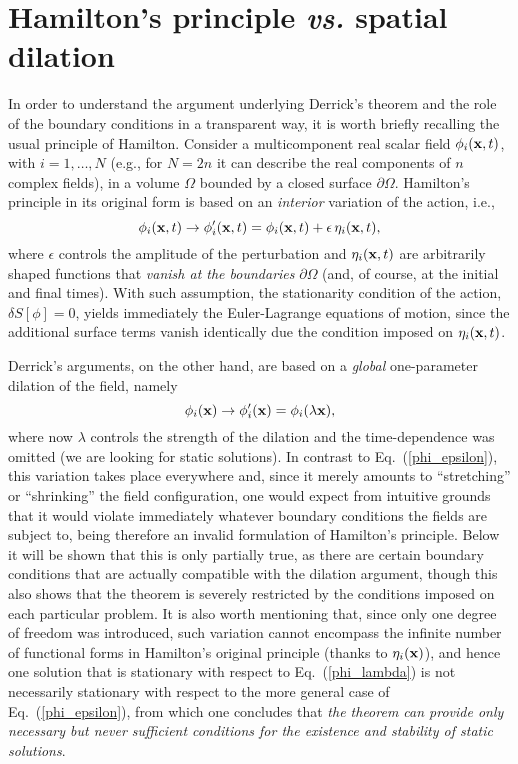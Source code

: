 \documentclass[a4paper,prd,twocolumn,showpacs,amsmath]{revtex4}
\newcommand{\vecx}{{\bf x}}
\newcommand{\domega}{\partial \Omega}
\begin{document}

\section{Hamilton's principle {\em vs.} spatial dilation} \label{hamilt}
In order to understand the argument underlying Derrick's theorem and the role of the boundary conditions
in a transparent way, it is worth briefly recalling the usual principle of Hamilton. Consider a multicomponent
real scalar field $\phi_i(\vecx,t)$, with $i=1,\ldots,N$ (e.g., for $N=2n$ it can describe the real components of
$n$ complex fields), in a volume $\Omega$ bounded by a closed surface $\domega$. Hamilton's principle
in its original form is based on an {\em interior} variation of the action, i.e.,
\begin{equation} \label{phi_epsilon}
  \phi_i(\vecx,t) \to \phi_i'(\vecx,t) = \phi_i(\vecx,t) + \epsilon \, \eta_i(\vecx,t),
\end{equation}
where $\epsilon$ controls the amplitude of the perturbation and $\eta_i(\vecx,t)$ are arbitrarily shaped
functions that {\em vanish at the boundaries} $\domega$ (and, of course, at the initial
and final times). With such assumption, the stationarity condition of the action, $\delta S[\phi]=0$, yields
immediately the Euler-Lagrange equations of motion, since the additional surface terms vanish
identically due the condition imposed on $\eta_i(\vecx,t)$.

Derrick's arguments, on the other hand, are based on a {\em global} one-parameter dilation of the
field, namely
\begin{equation} \label{phi_lambda}
  \phi_i(\vecx) \to \phi'_i(\vecx) = \phi_i(\lambda \vecx),
\end{equation}
where now $\lambda$ controls the strength of the dilation and the time-dependence was omitted (we are looking
for static solutions).
In contrast to Eq.~(\ref{phi_epsilon}), this variation takes place everywhere and, since it merely amounts to
``stretching'' or ``shrinking'' the field configuration, one would expect from intuitive grounds that it
would violate immediately whatever boundary conditions the fields are subject to, being therefore an invalid
formulation of Hamilton's principle.
Below it will be shown that this is only partially true, as there are certain boundary conditions
that are actually compatible with the dilation argument, though this also shows that the theorem is
severely restricted by the conditions imposed on each particular problem.
It is also worth mentioning that, since only one degree of freedom was introduced, such variation
cannot encompass the infinite number of functional forms in Hamilton's original principle (thanks to
$\eta_i(\vecx)$), and hence one solution that is
stationary with respect to Eq.~(\ref{phi_lambda}) is not necessarily stationary with respect to
the more general case of Eq.~(\ref{phi_epsilon}), from which one concludes that {\em the theorem can provide
only necessary but never sufficient conditions for the existence and stability of static solutions}.
\end{document}
